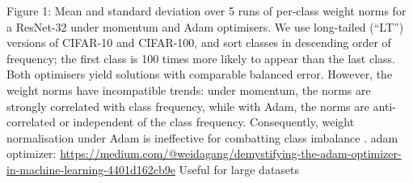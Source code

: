 Figure 1: Mean and standard deviation over 5 runs of per-class weight norms for a ResNet-32 under
momentum and Adam optimisers. We use long-tailed (“LT”) versions of CIFAR-10 and CIFAR-100,
and sort classes in descending order of frequency; the first class is 100 times more likely to appear
than the last class. Both optimisers yield solutions with comparable balanced error. However, the
weight norms have incompatible trends: under momentum, the norms are strongly correlated with
class frequency, while with Adam, the norms are anti-correlated or independent of the class frequency.
Consequently, weight normalisation under Adam is ineffective for combatting class imbalance \cite{menon2021longtaillearninglogitadjustment}.
adam optimizer: 
\url{https://medium.com/@weidagang/demystifying-the-adam-optimizer-in-machine-learning-4401d162cb9e}
Useful for large datasets \cite{kingma2017adammethodstochasticoptimization}
